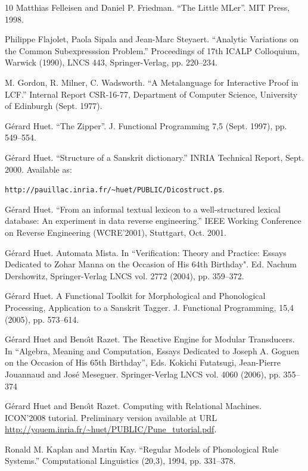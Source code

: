 \documentclass[12pt]{article}
\begin{document}
\begin{thebibliography}{10}
 Matthias Felleisen and Daniel P. Friedman. ``The Little MLer''. 
MIT Press, 1998.

 Philippe Flajolet, Paola Sipala and Jean-Marc Steyaert.
``Analytic Variations on the Common Subexpresssion Problem.'' Proceedings of
17th ICALP  Colloquium, Warwick (1990), LNCS 443, Springer-Verlag,
pp. 220--234.

M.  Gordon, R.  Milner, C.  Wadsworth.
``A Metalanguage for Interactive Proof in LCF.''
Internal Report CSR-16-77, Department of Computer Science,
University of Edinburgh (Sept. 1977).

 G\'erard Huet. ``The Zipper''. J. Functional Programming 7,5 
(Sept. 1997), pp. 549--554.

G\'erard Huet.
``Structure of a Sanskrit dictionary.''
INRIA Technical Report, Sept. 2000.
Available as: \raggedright
\verb!http://pauillac.inria.fr/~huet/PUBLIC/Dicostruct.ps!.

G\'erard Huet.
``From an informal textual lexicon to a well-structured lexical database:
An experiment in data reverse engineering.''
IEEE Working Conference on Reverse Engineering (WCRE'2001), 
Stuttgart, Oct. 2001.

G\'erard Huet. Automata Mista. In ``Verification: Theory and Practice: Essays Dedicated
to {Zohar} {Manna} on the Occasion of His 64th Birthday". Ed. Nachum Dershowitz,
Springer-Verlag LNCS vol. 2772 (2004), pp. 359--372.

G\'erard Huet. A Functional Toolkit for Morphological
and Phonological Processing, Application to a {Sanskrit} Tagger.
J. Functional Programming, 15,4 (2005), pp. 573--614. 

G\'erard Huet and Beno{\^\i}t Razet. The Reactive Engine for Modular Transducers.
In ``Algebra, Meaning and Computation, Essays Dedicated to 
Joseph A. Goguen on the Occasion of His 65th Birthday'', Eds.
Kokichi Futatsugi, Jean-Pierre Jouannaud and Jos\'e Meseguer.
Springer-Verlag LNCS vol. 4060 (2006), pp. 355--374

G\'erard Huet and Beno{\^\i}t Razet. Computing with Relational Machines.
ICON'2008 tutorial. Preliminary version available at URL
\url{http://yquem.inria.fr/~huet/PUBLIC/Pune_tutorial.pdf}.

 Ronald M. Kaplan and Martin Kay. ``Regular Models of
Phonological Rule Systems.'' Computational Linguistics (20,3), 1994,
pp. 331--378. 


\end{thebibliography}
\end{document}
